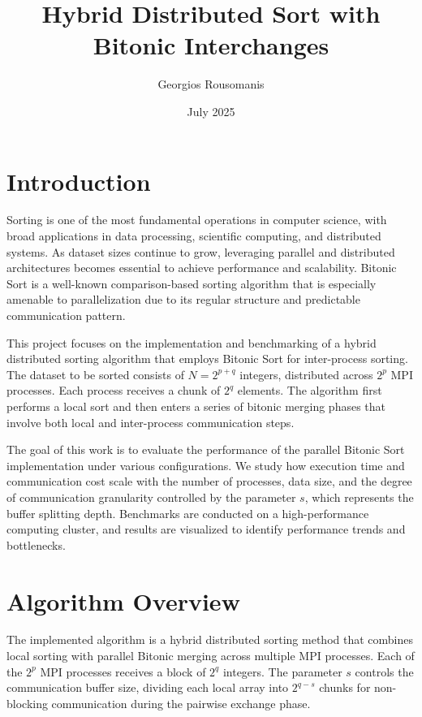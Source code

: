 \documentclass{article}
\title{Hybrid Distributed Sort with Bitonic Interchanges}
\author{Georgios Rousomanis}
\date{July 2025}
\begin{document}
\maketitle

\section{Introduction}

Sorting is one of the most fundamental operations in computer science, with broad applications in data 
processing, scientific computing, and distributed systems. As dataset sizes continue to grow, leveraging 
parallel and distributed architectures becomes essential to achieve performance and scalability. 
Bitonic Sort is a well-known comparison-based sorting algorithm that is especially amenable to 
parallelization due to its regular structure and predictable communication pattern.

This project focuses on the implementation and benchmarking of a hybrid distributed sorting algorithm that 
employs Bitonic Sort for inter-process sorting. The dataset to be sorted consists of $N = 2^{p+q}$ integers,
distributed across $2^p$ MPI processes. Each process receives a chunk of $2^q$ elements. The algorithm first 
performs a local sort and then enters a series of bitonic merging phases that involve both local and 
inter-process communication steps.

The goal of this work is to evaluate the performance of the parallel Bitonic Sort implementation under various 
configurations. We study how execution time and communication cost scale with the number of processes, data size, 
and the degree of communication granularity controlled by the parameter $s$, which represents the buffer splitting
depth. Benchmarks are conducted on a high-performance computing cluster, and results are visualized to identify 
performance trends and bottlenecks.

\section{Algorithm Overview}

The implemented algorithm is a hybrid distributed sorting method that combines local sorting with 
parallel Bitonic merging across multiple MPI processes. Each of the $2^p$ MPI processes receives a 
block of $2^q$ integers. The parameter $s$ controls the communication buffer size, dividing each local 
array into $2^{q-s}$ chunks for non-blocking communication during the pairwise exchange phase.
\end{document}

